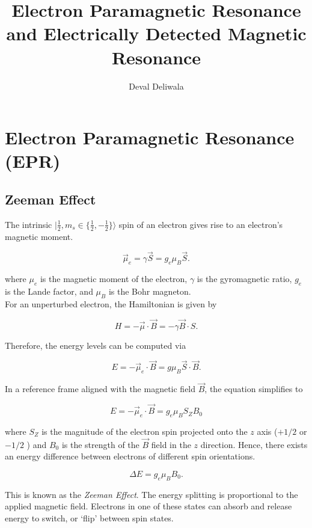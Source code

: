 \documentclass[svgnames]{article}
\title{Electron Paramagnetic Resonance and Electrically Detected Magnetic
Resonance}
\author{Deval Deliwala}
\begin{document}
\maketitle
\newpage 

\section{Electron Paramagnetic Resonance (EPR)} 

\subsection{Zeeman Effect} 

The intrinsic $|\frac{1}{2}, m_s \in \{\frac{1}{2}, -\frac{1}{2}\} \rangle$ spin of an electron gives rise to an
electron's magnetic moment. 

\[
    \vec{\mu}_e = \gamma \vec{S} = g_e \mu_B \vec{S}. 
\] \vspace{3px}

where $\mu_e$ is the magnetic moment of the electron, $\gamma$ is the
gyromagnetic ratio, $g_e$ is the Lande factor, and $\mu_B$ is the Bohr
magneton.\\ 

For an unperturbed electron, the Hamiltonian is given by 

\[
    H = -\vec{\mu} \cdot \vec{B} = -\gamma \vec{B} \cdot S.
\] \vspace{3px}

Therefore, the energy levels can be computed via 

\[
    E = -\vec{\mu}_e \cdot \vec{B} = g\mu_B \vec{S} \cdot \vec{B}.
\] \vspace{3px}

In a reference frame aligned with the magnetic field $\vec{B}$, the equation
simplifies to 

\[ E = -\vec{\mu}_e \cdot \vec{B} = g_e \mu_B S_Z B_0 \] \vspace{3px}

where $S_Z$ is the magnitude of the electron spin projected onto the $z$ axis
($+1/2$ or $-1/2$ ) and $B_0$ is the strength of the $\vec{B}$ field in the $z$
direction. Hence, there exists an energy difference between electrons of
different spin orientations. 

\[
\Delta E = g_e \mu_B B_0.
\] \vspace{3px}

This is known as the \textit{Zeeman Effect}. The energy splitting is
proportional to the applied magnetic field. Electrons in one of these states can
absorb and release energy to switch, or `flip' between spin states. \\
\end{document}
